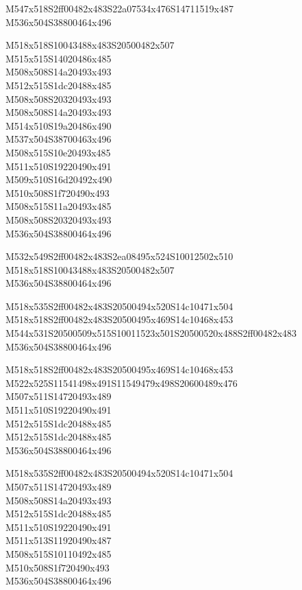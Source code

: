 \documentclass{article}
\begin{document}
\begin{multicols}{5}
\begin{center}
M547x518S2ff00482x483S22a07534x476S14711519x487 %
\\M536x504S38800464x496 %

M518x518S10043488x483S20500482x507 %
\\M515x515S14020486x485 %
\\M508x508S14a20493x493 %
\\M512x515S1dc20488x485 %
\\M508x508S20320493x493 %
\\M508x508S14a20493x493 %
\\M514x510S19a20486x490 %
\\M537x504S38700463x496 %
\\M508x515S10e20493x485 %
\\M511x510S19220490x491 %
\\M509x510S16d20492x490 %
\\M510x508S1f720490x493 %
\\M508x515S11a20493x485 %
\\M508x508S20320493x493 %
\\M536x504S38800464x496 %

M532x549S2ff00482x483S2ea08495x524S10012502x510 %
\\M518x518S10043488x483S20500482x507 %
\\M536x504S38800464x496 %

M518x535S2ff00482x483S20500494x520S14c10471x504 %
\\M518x518S2ff00482x483S20500495x469S14c10468x453 %
\\M544x531S20500509x515S10011523x501S20500520x488S2ff00482x483 %
\\M536x504S38800464x496 %

M518x518S2ff00482x483S20500495x469S14c10468x453 %
\\M522x525S11541498x491S11549479x498S20600489x476 %
\\M507x511S14720493x489 %
\\M511x510S19220490x491 %
\\M512x515S1dc20488x485 %
\\M512x515S1dc20488x485 %
\\M536x504S38800464x496 %

M518x535S2ff00482x483S20500494x520S14c10471x504 %
\\M507x511S14720493x489 %
\\M508x508S14a20493x493 %
\\M512x515S1dc20488x485 %
\\M511x510S19220490x491 %
\\M511x513S11920490x487 %
\\M508x515S10110492x485 %
\\M510x508S1f720490x493 %
\\M536x504S38800464x496 %


\end{center}
\end{multicols}
\end{document}
